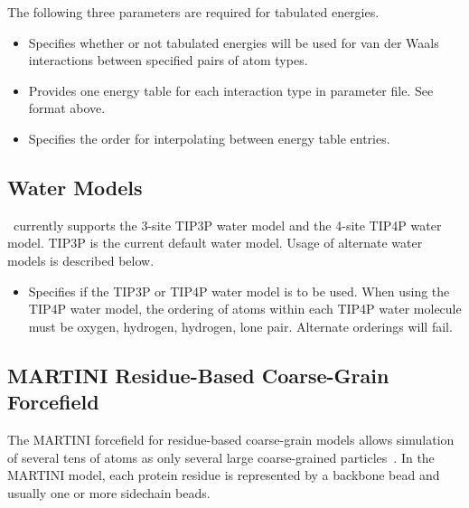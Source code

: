 The following three parameters are required for tabulated energies.

\begin{itemize}

\item
{}
{Specifies whether or not tabulated energies will be used for
van der Waals interactions between specified pairs of atom types.}

\item
{}
{Provides one energy table for each interaction type in parameter file.
See format above.}

\item
{}
{Specifies the order for interpolating between energy table entries.}

\end{itemize}


\subsection{Water Models}
\label{section:water_models}

\NAMD~currently supports the 3-site TIP3P water model and the 4-site TIP4P water model.  TIP3P is the current default water model.  Usage of alternate water models is described below. 

\begin{itemize}

  \item
    {Specifies if the TIP3P or TIP4P water model is to be used.  When using the TIP4P water model, the ordering of atoms within each TIP4P water molecule must be oxygen, hydrogen, hydrogen, lone pair.  Alternate orderings will fail. } 

\end{itemize}


\subsection{MARTINI Residue-Based Coarse-Grain Forcefield}

The MARTINI forcefield for residue-based coarse-grain models allows simulation of several tens of atoms as only several large coarse-grained particles~\cite{MARR2004, MARR2007, MONT2008}.  In the MARTINI model, each protein residue is represented by a backbone bead and usually one or more sidechain beads.  

